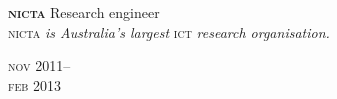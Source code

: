 
\begin{minipage}[t]{0.75\textwidth}
\textbf{\textsc{nicta}}\phantom{..} Research engineer \\
{\small
\textsc{nicta}\textit{ is Australia's largest} \textsc{ict} \textit{research organisation.}
}
\end{minipage}
\begin{minipage}[t]{0.25\textwidth}
{
\hfill \textsc{nov} 2011--\\ 
\hspace*{0pt} \hfill \textsc{feb} 2013
\par
}
\end{minipage}






